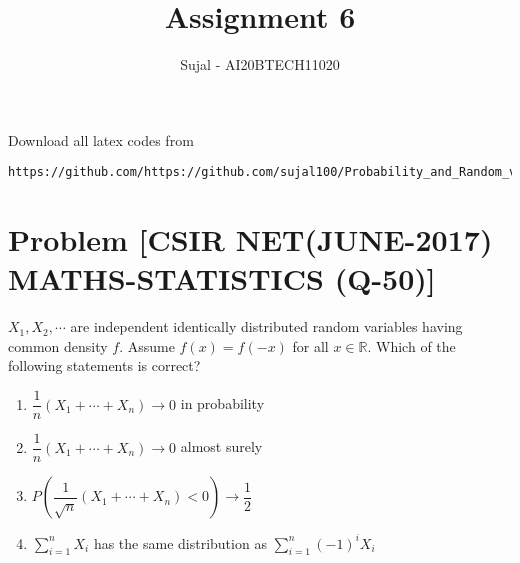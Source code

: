 \documentclass[journal,12pt,twocolumn]{IEEEtran}
\begin{document}
\let\StandardTheFigure\thefigure
\let\vec\mathbf
\renewcommand{\thefigure}{\theproblem}
\def\putbox#1#2#3{\makebox[0in][l]{\makebox[#1][l]{}\raisebox{\baselineskip}[0in][0in]{\raisebox{#2}[0in][0in]{#3}}}}
     \def\rightbox#1{\makebox[0in][r]{#1}}
     \def\centbox#1{\makebox[0in]{#1}}
     \def\topbox#1{\raisebox{-\baselineskip}[0in][0in]{#1}}
     \def\midbox#1{\raisebox{-0.5\baselineskip}[0in][0in]{#1}}
\vspace{3cm}
\title{Assignment 6}
\author{Sujal - AI20BTECH11020}
\maketitle
\newpage
\bigskip
\renewcommand{\thefigure}{\theenumi}
\renewcommand{\thetable}{\theenumi}
Download all latex codes from 

\begin{lstlisting}
https://github.com/https://github.com/sujal100/Probability_and_Random_variable/blob/main/exercise_6/exercise_6_main_tex.tex
\end{lstlisting}

\section{Problem [CSIR NET(JUNE-2017) MATHS-STATISTICS (Q-50)]}
$X_{1}, X_{2}, \cdots$ are independent identically distributed random variables
having common density $f$. Assume $f(x)=f(-x)$ for all $x \in \mathbb{R}$. Which of the following statements is correct?
\begin{enumerate}[label=\alph*)]
\item $\dfrac{1}{n}\left(X_{1}+\cdots+X_{n}\right) \rightarrow 0$ in probability
\item $\dfrac{1}{n}\left(X_{1}+\cdots+X_{n}\right) \rightarrow 0$ almost surely
\item $P\left(\dfrac{1}{\sqrt{n}}\left(X_{1}+\cdots+X_{n}\right)<0\right) \rightarrow \dfrac{1}{2}$
\item $\sum_{i=1}^{n} X_{i}$ has the same distribution as $\sum_{i=1}^{n}(-1)^{i} X_{i}$
\end{enumerate}
\end{document}
